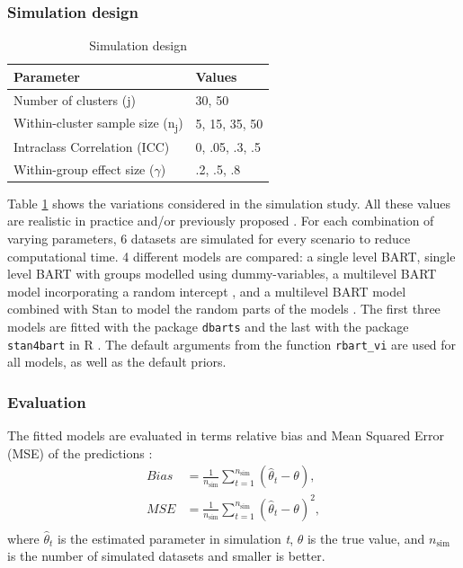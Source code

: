 \documentclass[10pt, a4paper, titlepage]{article}
\begin{document}
\subsubsection{Simulation design}
\begin{table}
\centering
\caption{Simulation design}
\label{tab:simulationparameters}
\begin{tabular}{l|l}
\textbf{Parameter}                                  & \textbf{Values} \\ \hline
Number of clusters (j)                              & 30, 50          \\
Within-cluster sample size (n\textsubscript{j})     & 5, 15, 35, 50   \\
Intraclass Correlation (ICC)                        & 0, .05, .3, .5  \\
Within-group effect size ($\gamma$)                 & .2, .5, .8
\end{tabular}
\end{table}

Table \ref{tab:simulationparameters} shows the variations considered in the simulation study. All these values are realistic in practice and/or previously proposed \citep{gulliford1999, murray2003, hox2017, grund2018, enders2018a, enders2020}. For each combination of varying parameters, 6 datasets are simulated for every scenario to reduce computational time. 4 different models are compared: a single level BART, single level BART with groups modelled using dummy-variables, a multilevel BART model incorporating a random intercept \citep{chen2020, wagner2020, tan2016, wundervald2022}, and a multilevel BART model combined with Stan to model the random parts of the models \citep{dorie2022}. The first three models are fitted with the package \texttt{dbarts} \citep{dorie2023} and the last with the package \texttt{stan4bart} \citep{dorie2023a} in R \citep{rcoreteam2023}. The default arguments from the function \texttt{rbart\_vi} are used for all models, as well as the default priors.

\subsubsection{Evaluation}
The fitted models are evaluated in terms relative bias and Mean Squared Error (MSE) of the predictions \citep{morris2019}:
\begin{subequations}
\label{eq:evaluations}
\begin{align}
Bias &= \frac{1}{n_{\text{sim}}} \sum_{t=1}^{n_{\text{sim}}} (\hat{\theta}_t - \theta), \tag{5} \\
MSE &= \frac{1}{n_{\text{sim}}} \sum_{t=1}^{n_{\text{sim}}} (\hat{\theta}_t - \theta)^{2}, \tag{6} \\
\end{align}
\end{subequations}
where $\hat{\theta}_t$ is the estimated parameter in simulation \textit{t}, $\theta$ is the true value, and $n_{\text{sim}}$ is the number of simulated datasets and smaller is better.
\end{document}
